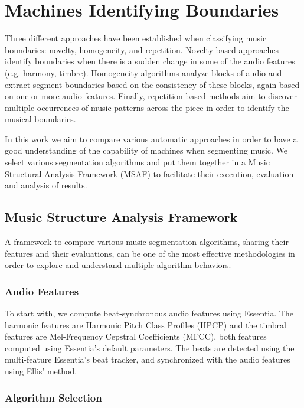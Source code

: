 \documentclass{article}
\begin{document}
\section{Machines Identifying Boundaries}\label{sec:eval_desc}

Three different approaches have been established when classifying music boundaries: novelty, homogeneity, and repetition\cite{Paulus2010}. 
Novelty-based approaches identify boundaries when there is a sudden change in some of the audio features (e.g. harmony, timbre).
Homogeneity algorithms analyze blocks of audio and extract segment boundaries based on the consistency of these blocks, again based on one or more audio features.
Finally, repetition-based methods aim to discover multiple occurrences of music patterns across the piece in order to identify the musical boundaries.

In this work we aim to compare various automatic approaches in order to have a good understanding of the capability of machines when segmenting music.
We select various segmentation algorithms and put them together in a Music Structural Analysis Framework (MSAF) to facilitate their execution, evaluation and analysis of results.

\subsection{Music Structure Analysis Framework}

A framework to compare various music segmentation algorithms, sharing their features and their evaluations, can be one of the most effective methodologies in order to explore and understand multiple algorithm behaviors.

\subsubsection{Audio Features}

To start with, we compute beat-synchronous audio features using Essentia\cite{Bogdanov2013}.
The harmonic features are Harmonic Pitch Class Profiles (HPCP) and the timbral features are Mel-Frequency Cepstral Coefficients (MFCC), both features computed using Essentia's default parameters.
The beats are detected using the multi-feature Essentia's beat tracker, and synchronized with the audio features using Ellis' method\cite{Ellis2007}.

\subsubsection{Algorithm Selection}
\end{document}
